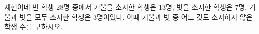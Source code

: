 재현이네 반 학생 $28$명 중에서 거울을 소지한 학생은 $13$명, 빗을 소지한 학생은 $7$명, 거울과 빗을 모두 소지한 학생은 $3$명이었다. 이때 거울과 빗 중 어느 것도 소지하지 않은 학생 수를 구하시오.
